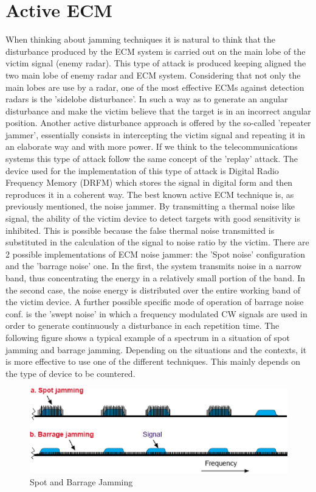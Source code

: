 \documentclass[12pt]{report}
\begin{document}
 \section{Active ECM}
 When thinking about jamming techniques it is natural to think that the disturbance produced by the ECM system is carried out on the main lobe of the victim signal (enemy radar). This type of attack is produced keeping aligned the two main lobe of enemy radar and ECM system. Considering that not only the main lobes are use by a radar, one of the most effective ECMs against detection radars is the 'sidelobe disturbance'. In such a way as to generate an angular disturbance and make the victim believe that the target is in an incorrect angular position. \newline Another active disturbance approach is offered by the so-called 'repeater jammer', essentially consists in intercepting the victim signal and repeating it in an elaborate way and with more power. If we think to the telecommunications systems this type of attack follow the same concept of the 'replay' attack. The device used for the implementation of this type of attack is Digital Radio Frequency Memory (DRFM) which stores the signal in digital form and then reproduces it in a coherent way. The best known active ECM technique is, as previously mentioned, the noise jammer. By transmitting a thermal noise like signal, the ability of the victim device to detect targets with good sensitivity is inhibited. This is possible because the false thermal noise transmitted is substituted in the calculation of the signal to noise ratio by the victim. There are 2 possible implementations of ECM noise jammer: the 'Spot noise' configuration and the 'barrage noise' one. In the first, the system transmits noise in a narrow band, thus concentrating the energy in a relatively small portion of the band. In the second case, the noise energy is distributed over the entire working band of the victim device. A further possible specific mode of operation of barrage noise conf. is the 'swept noise' in which a frequency modulated CW signals are used in order to generate  continuously a disturbance in each repetition time. The following figure shows a typical example of a spectrum in a situation of spot jamming and barrage jamming. Depending on the situations and the contexts, it is more effective to use one of the different techniques. This mainly depends on the type of device to be countered. 
 
 \begin{figure}[h!]
    \centering
    \includegraphics[width=12cm]{Pictures/spot_and_barriage_jamming.png}
    \caption{Spot and Barrage Jamming}
\end{figure}
 
\end{document}
